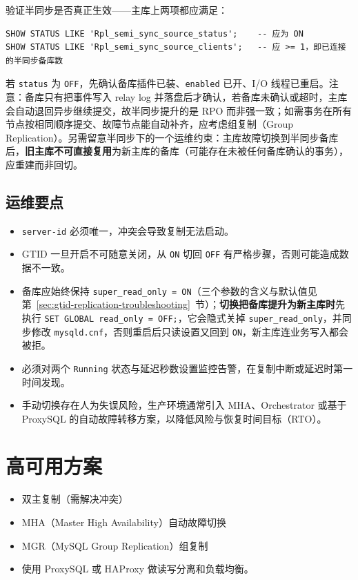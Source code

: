 \documentclass[12pt,UTF8]{ctexbook}
\begin{document}
验证半同步是否真正生效——主库上两项都应满足：

\begin{lstlisting}
SHOW STATUS LIKE 'Rpl_semi_sync_source_status';    -- 应为 ON
SHOW STATUS LIKE 'Rpl_semi_sync_source_clients';   -- 应 >= 1，即已连接的半同步备库数
\end{lstlisting}

若 \texttt{status} 为 \texttt{OFF}，先确认备库插件已装、\texttt{enabled} 已开、I/O 线程已重启。注意：备库只有把事件写入 relay log 并落盘后才确认，若备库未确认或超时，主库会自动退回异步继续提交，故半同步提升的是 RPO 而非强一致；如需事务在所有节点按相同顺序提交、故障节点能自动补齐，应考虑组复制（Group Replication）。另需留意半同步下的一个运维约束：主库故障切换到半同步备库后，\textbf{旧主库不可直接复用}为新主库的备库（可能存在未被任何备库确认的事务），应重建而非回切。

\subsection{运维要点}

\begin{itemize}[leftmargin=2cm]
  \item \texttt{server-id} 必须唯一，冲突会导致复制无法启动。
  \item GTID 一旦开启不可随意关闭，从 \texttt{ON} 切回 \texttt{OFF} 有严格步骤，否则可能造成数据不一致。
  \item 备库应始终保持 \texttt{super\_read\_only = ON}（三个参数的含义与默认值见第~\ref{sec:gtid-replication-troubleshooting}~节）；\textbf{切换把备库提升为新主库时}先执行 \texttt{SET GLOBAL read\_only = OFF;}，它会隐式关掉 \texttt{super\_read\_only}，并同步修改 \texttt{mysqld.cnf}，否则重启后只读设置又回到 \texttt{ON}，新主库连业务写入都会被拒。
  \item 必须对两个 \texttt{Running} 状态与延迟秒数设置监控告警，在复制中断或延迟时第一时间发现。
  \item 手动切换存在人为失误风险，生产环境通常引入 MHA、Orchestrator 或基于 ProxySQL 的自动故障转移方案，以降低风险与恢复时间目标（RTO）。
\end{itemize}

\section{高可用方案}

\begin{itemize}
  \item 双主复制（需解决冲突）
  \item MHA（Master High Availability）自动故障切换
  \item MGR（MySQL Group Replication）组复制
  \item 使用 ProxySQL 或 HAProxy 做读写分离和负载均衡。
\end{itemize}
\end{document}
